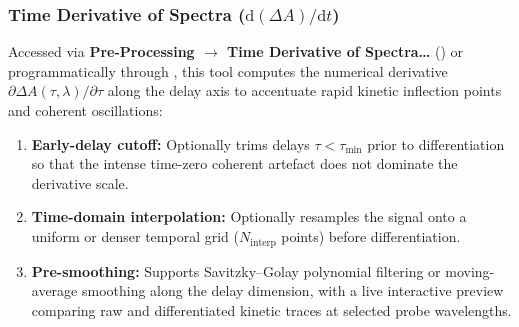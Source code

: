 \subsubsection{Time Derivative of Spectra ($\mathrm{d}(\Delta A)/\mathrm{d}t$)}\label{sec:oneD:timederiv}

Accessed via \textbf{Pre-Processing $\to$ Time Derivative of Spectra\ldots} () or programmatically through , this tool computes the numerical derivative $\partial \Delta A(\tau, \lambda) / \partial \tau$ along the delay axis to accentuate rapid kinetic inflection points and coherent oscillations:
\begin{enumerate}
  \item \textbf{Early-delay cutoff:} Optionally trims delays $\tau < \tau_{\min}$ prior to differentiation so that the intense time-zero coherent artefact does not dominate the derivative scale.
  \item \textbf{Time-domain interpolation:} Optionally resamples the signal onto a uniform or denser temporal grid ($N_{\text{interp}}$ points) before differentiation.
  \item \textbf{Pre-smoothing:} Supports Savitzky--Golay polynomial filtering or moving-average smoothing along the delay dimension, with a live interactive preview comparing raw and differentiated kinetic traces at selected probe wavelengths.
\end{enumerate}
